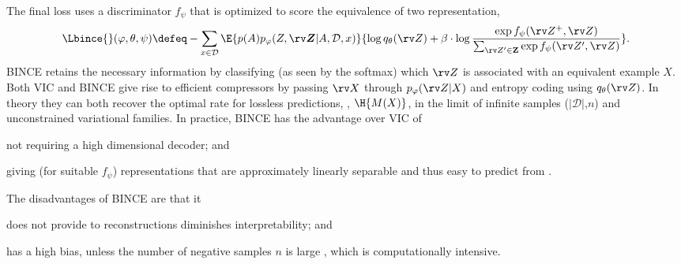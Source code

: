 \documentclass[final]{article}
\begin{document}
The final loss uses a discriminator $f_\psi$ that is optimized to score the equivalence of two representation,
\begin{equation}\label{eq:bottlenecked_simclr}
\Lbince{}(\varphi, \theta, \psi) \defeq
-
\sum_{x \in \mathcal{D}}  \E{p(A) p_{\varphi}(Z, \boldsymbol{\rv Z}| A,\mathcal{D},x)}{ \log q_\theta(\rv Z)
+ \beta \cdot \log \frac{\exp f_\psi(\rv Z^{+}, \rv Z)}{\sum_{\rv Z' \in \mathbf{Z}} \exp f_\psi(\rv Z', \rv Z) }}.
\end{equation}
BINCE retains the necessary information by classifying (as seen by the softmax) which $\rv Z$ is associated with an equivalent example $X$.
Both VIC and BINCE give rise to efficient compressors by passing $\rv X$ through $p_{\varphi}(\rv Z |X)$ and entropy coding using $q_\theta(\rv Z)$.
In theory they can both recover the optimal rate for lossless predictions, \ie, $\H{M(X)}$, in the limit of infinite samples ($|\mathcal D|$,$n$) and unconstrained variational families.
In practice, BINCE  has the advantage over VIC of 
\begin{inlinelist}
\item not requiring a high dimensional decoder; and
\item  giving (for suitable $f_{\psi}$) representations that are approximately linearly separable \cite{saunshi_theoretical_2019,tosh_contrastive_2021,lee_predicting_2020} and thus easy to predict from \cite{chen_simple_2020,oord_representation_2019}.
\end{inlinelist}
The disadvantages of BINCE are that it
\begin{inlinelist}
\item does not provide to reconstructions diminishes interpretability; and
\item has a high bias, unless the number of negative samples $n$ is large \cite{poole_variational_2019,song_multi-label_2020}, which is computationally intensive.
\end{inlinelist}
















 
\end{document}
